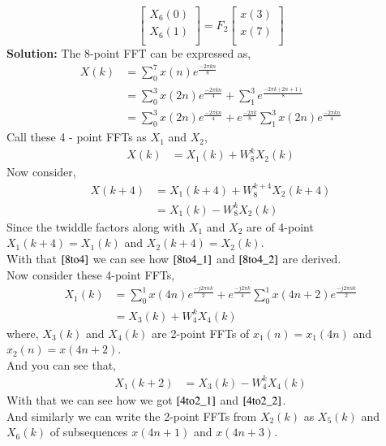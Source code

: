 \documentclass[journal,12pt,twocolumn]{IEEEtran}
\newcommand{\solution}{\noindent \textbf{Solution: }}
\providecommand{\brak}[1]{\ensuremath{\left(#1\right)}}
\numberwithin{equation}{section}
\renewcommand\thesection{\arabic{section}}
\begin{document}
\begin{enumerate}[label=\arabic*.,ref=\thesection.\theenumi]
\begin{equation}
\begin{bmatrix}
X_{6}(0) \\ 
X_{6}(1)\\ 
\end{bmatrix}
= F_{2}
\begin{bmatrix}
x(3) \\ 
x(7) \\ 
\end{bmatrix}
\end{equation}
\solution The 8-point FFT can be expressed as,
 \begin{align}
 	X(k) &= \sum_{0}^{7}x(n)e^{\frac{-2\pi kn}{8}} \\
 	     &= \sum_{0}^{3}x(2n)e^{\frac{-2 \pi kn}{4}} + \sum_{1}^{3}e^{\frac{-2 \pi k\brak{2n+1}}{8}} \\
 	     &= \sum_{0}^{3}x(2n)e^{\frac{-2 \pi kn}{4}} + e^{\frac{-2 \pi k}{8}}\sum_{1}^{3}x(2n)e^{\frac{-2 \pi kn}{4}}
  \end{align}
 Call these 4 - point FFTs as $X_1$ and $X_2$,
  \begin{align}
  	X(k) & =X_1(k) + W_{8}^kX_2(k)
  \end{align}  
Now consider,
  \begin{align}
  	X(k+4) &= X_1(k+4)  + W_{8}^{k + 4}X_2(k+4)\\
           & = X_1(k) -W_{8}^kX_2(k) \label{8to4} 	      
   \end{align}
Since the twiddle factors along with $X_1$ and $X_2$ are of 4-point $X_1(k+4) =X_1(k)$ and $X_2(k+4) = X_2(k)$. \\
With that $\eqref{8to4}$ we can see how $\eqref{8to4_1}$ and $\eqref{8to4_2}$ are derived.\\
Now consider these 4-point FFTs,
 \begin{align}
 	X_1(k) &= \sum_{0}^{1}x(4n)e^{\frac{-j 2\pi nk}{2}} + e^{\frac{-j2\pi k}{4}}\sum_{0}^{1}x(4n+2)e^{\frac{-j2\pi nk}{2}} \\
 		   &= X_3(k) + W_4^kX_4(k)
 	\end{align}
 where, $X_3(k)$ and $X_4(k)$ are 2-point FFTs of $x_1(n) = x_1(4n)$ and $x_2(n) = x(4n+2)$.\\
 And you can see that,
  \begin{align}
  	X_1(k+2) &= X_3(k) - W_{4}^kX_4(k)
  \end{align}
With that we can see how we got $\eqref{4to2_1}$ and $\eqref{4to2_2}$. \\
And similarly we can write the 2-point FFTs from $X_2(k)$ as $X_5(k)$  and $X_6(k)$ of subsequences $x(4n+1)$ and $x(4n+3)$.\\

\end{enumerate}
\end{document}
